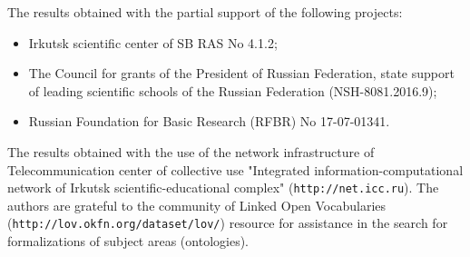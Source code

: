 \documentclass[conference,a4paper]{IEEEtran}
\providecommand\url[1]{\texttt{#1}}
\begin{document}
The results obtained with the partial support of the following projects:
\begin{itemize}
\item Irkutsk scientific center of SB RAS No 4.1.2;
\item The Council for grants of the President of Russian Federation, state support of leading scientific schools of the Russian Federation (NSH-8081.2016.9);
\item Russian Foundation for Basic Research (RFBR) No 17-07-01341.

  \end{itemize}
The results obtained with the use of the network infrastructure of Telecommunication center of collective use "Integrated information-computational network of Irkutsk scientific-educational complex" (\url{http://net.icc.ru}). The authors are grateful to the community of Linked Open Vocabularies (\url{http://lov.okfn.org/dataset/lov/}) resource for assistance in the search for formalizations of subject areas (ontologies).



\end{document}
